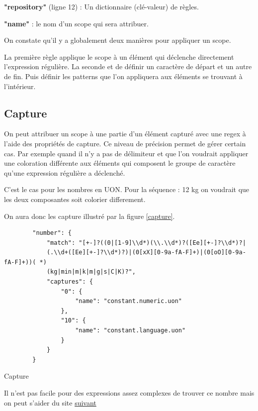 \documentclass[
    iict, %
    il, %
]{heig-tb}
\begin{document}
\textbf{"repository"} (ligne 12) : Un dictionnaire (clé-valeur) de règles.

\textbf{"name"} : le nom d'un scope qui sera attribuer.

On constate qu'il y a globalement deux manières pour appliquer un scope.

La première règle applique le scope à un élément qui déclenche directement l'expression régulière.
La seconde et de définir un caractère de départ et un autre de fin. Puis définir les patterns que l'on appliquera aux éléments se trouvant à l'intérieur.

\subsection{Capture}

On peut attribuer un scope à une partie d'un élément capturé avec une regex à l'aide des propriétés de capture.
Ce niveau de précision permet de gérer certain cas. Par exemple quand il n'y a pas de délimiteur et que l'on voudrait appliquer une coloration différente aux éléments qui composent le groupe de caractère qu'une expression régulière
a déclenché.

C'est le cas pour les nombres en UON. Pour la séquence : 12 kg on voudrait que les deux composantes soit colorier differement.

On aura donc les capture illustré par la figure \ref{capture}.

\begin{listing}[!ht]
    \begin{verbatim}
        "number": {
            "match": "[+-]?((0|[1-9]\\d*)(\\.\\d*)?([Ee][+-]?\\d*)?|
            (.\\d+([Ee][+-]?\\d*)?)|(0[xX][0-9a-fA-F]+)|(0[oO][0-9a-fA-F]+))( *)
            (kg|min|m|k|m|g|s|C|K)?",
            "captures": {
                "0": {
                    "name": "constant.numeric.uon"
                },
                "10": {
                    "name": "constant.language.uon"
                }
            }
        }
    \end{verbatim}
    \caption{Capture}
    \label{capture}
\end{listing}

Il n'est pas facile pour des expressions assez complexes de trouver ce nombre mais on peut s'aider du site \href{https://regex101.com/}{suivant}
\end{document}
